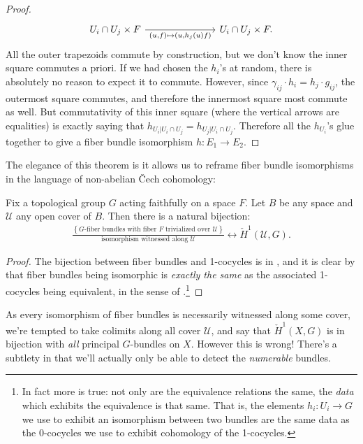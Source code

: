 \documentclass[11pt]{book}
\begin{document}
\begin{proof}
\[\begin{tikzcd}
     U_i \cap U_j \times F\ar[rrr,"{(u,f) \mapsto (u,h_j(u)f)}" below] &  &  & U_i \cap U_j \times F.
\end{tikzcd} \]
All the outer trapezoids commute by construction, but we don't know the inner square commutes a priori. If we had chosen the $h_i$'s at random, there is absolutely no reason to expect it to commute. However, since $\gamma_{ij}\cdot h_i = h_j \cdot g_{ij}$, the outermost square commutes, and therefore the innermost square most commute as well. But commutativity of this inner square (where the vertical arrows are equalities) is exactly saying that $h_{U_i | U_i \cap U_j} = h_{U_j | U_i \cap U_j}$. Therefore all the $h_{U_i}$'s glue together to give a fiber bundle isomorphism $h \colon E_1 \to E_2$.
\end{proof}

The elegance of this theorem is it allows us to reframe fiber bundle isomorphisms in the language of non-abelian \v{C}ech cohomology:

\begin{theorem}\label{thm:nonabelian-h1-cech-cover}
Fix a topological group $G$ acting faithfully on a space $F$. Let $B$ be any space and $\mathcal{U}$ any open cover of $B$. Then there is a natural bijection:
\begin{equation}\label{eqn:cech-cohomology-fiber-bundles-along-cover}
\begin{aligned}
    \frac{\left\{ G\text{-fiber bundles with fiber }F\text{ trivialized over }\mathcal{U} \right\}}{\text{isomorphism witnessed along }\mathcal{U}} \leftrightarrow \check{H}^1(\mathcal{U},G).
\end{aligned}
\end{equation}
\end{theorem}
\begin{proof} The bijection between fiber bundles and 1-cocycles is in , and it is clear by  that fiber bundles being isomorphic is \emph{exactly the same} as the associated 1-cocycles being equivalent, in the sense of .\footnote{In fact more is true: not only are the equivalence relations the same, the \emph{data} which exhibits the equivalence is that same. That is, the elements $h_i \colon U_i \to G$ we use to exhibit an isomorphism between two bundles are the same data as the 0-cocycles we use to exhibit cohomology of the 1-cocycles.}
\end{proof}


As every isomorphism of fiber bundles is necessarily witnessed along some cover, we're tempted to take colimits along all cover $\mathcal{U}$, and say that $\check{H}^1(X,G)$ is in bijection with \emph{all} principal $G$-bundles on $X$. However this is wrong! There's a subtlety in that we'll actually only be able to detect the \emph{numerable} bundles.
\end{document}
